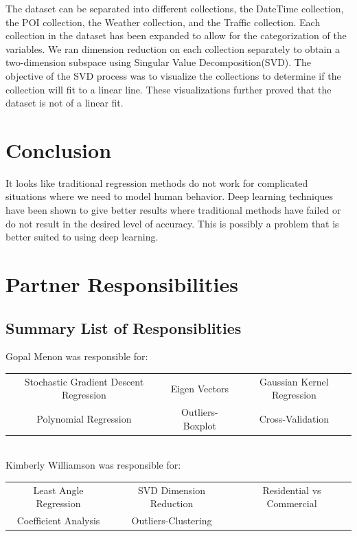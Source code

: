 \documentclass[paper=a4, fontsize=11pt]{scrartcl} %
\numberwithin{equation}{section} %
\numberwithin{table}{section} %
\begin{document}
The dataset can be separated into different collections, the DateTime collection, the POI collection, the Weather collection, and the Traffic collection. Each collection in the dataset has been expanded to allow for the categorization of the variables. We ran dimension reduction on each collection separately to obtain a two-dimension subspace using Singular Value Decomposition(SVD). The objective of the SVD process was to visualize the collections to determine if the collection will fit to a linear line.  These visualizations further proved that the dataset is not of a linear fit.

\section{Conclusion}
 
It looks like traditional regression methods do not work for complicated situations where we need to model human behavior. Deep learning techniques have been shown to give better results where traditional methods have failed or do not result in the desired level of accuracy. This is possibly a problem that is better suited to using deep learning.

\section{Partner Responsibilities}
\subsection{Summary List of Responsiblities}
Gopal Menon was responsible for:\\
\begin{tabular}{c|c|c}
Stochastic Gradient Descent Regression& Eigen Vectors & Gaussian Kernel Regression \\
Polynomial Regression & Outliers-Boxplot&Cross-Validation\\
\end{tabular} \\

Kimberly Williamson was responsible for:\\
\begin{tabular}{c|c|c}
Least Angle Regression & SVD Dimension Reduction & Residential vs Commercial \\
Coefficient Analysis & Outliers-Clustering\\
\end{tabular}\\
\end{document}
